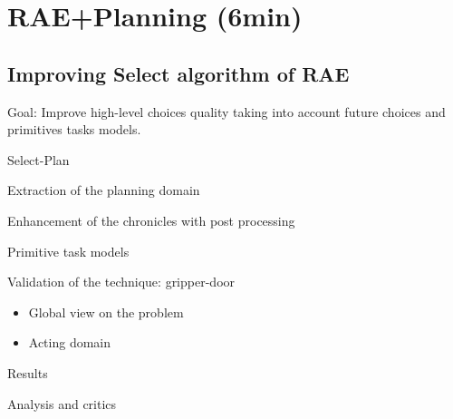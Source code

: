 \section{RAE+Planning (6min)}
\subsection{Improving Select algorithm of RAE}
\begin{frame}
    Goal: Improve high-level choices quality taking into account future choices and primitives tasks models.
\end{frame}
\begin{frame}{Select-Plan}
    
\end{frame}
\begin{frame}{Extraction of the planning domain}
    
\end{frame}
\begin{frame}{Enhancement of the chronicles with post processing}
    
\end{frame}
\begin{frame}{Primitive task models}
    
\end{frame}
\begin{frame}{Validation of the technique: gripper-door}
    \begin{itemize}
        \item Global view on the problem
        \item Acting domain
    \end{itemize}
\end{frame}
\begin{frame}{Results}
    
\end{frame}
\begin{frame}{Analysis and critics}
    
\end{frame}